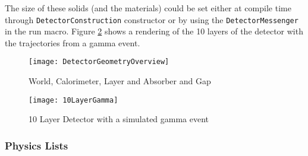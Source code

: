 The size of these solids (and the materials) could be set either at compile time through \verb+DetectorConstruction+ constructor or by using the \verb+DetectorMessenger+ in the run macro.
Figure \ref{fig:LayerDetectorGeo} shows a rendering of the 10 layers of the detector with the trajectories from a gamma event.

\begin{figure}[htb] 
    \texttt{[image: DetectorGeometryOverview]}
	\caption{World, Calorimeter, Layer and Absorber and Gap}
    \label{fig:GeoDiagram}
\end{figure}
\begin{figure}[ht] 
    \texttt{[image: 10LayerGamma]}
	\caption{10 Layer Detector with a simulated gamma event}
    \label{fig:LayerDetectorGeo}
\end{figure}

\subsubsection{Physics Lists}

